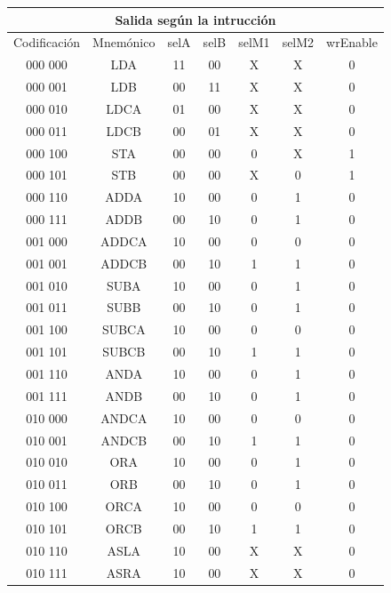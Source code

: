\documentclass[paper=letter, fontsize=12pt]{article}
\begin{document}
\begin{table}
\centering
\begin{tabular}{cc|ccccc}
\multicolumn{7}{c}{Salida según la intrucción} \\ \hline
Codificación& Mnemónico	  	& selA & selB & selM1 & selM2 & wrEnable \\ \hline
000 000 	& LDA 		  	& 11 	& 00    & X     & X     & 0 \\
000 001		& LDB  			& 00 	& 11    & X     & X     & 0 \\           
000 010 	& LDCA 			& 01 	& 00    & X     & X     & 0 \\            
000 011 	& LDCB 			& 00 	& 01    & X     & X     & 0 \\           
000 100 	& STA  	 		& 00 	& 00    & 0     & X     & 1 \\            
000 101 	& STB  			& 00 	& 00    & X     & 0     & 1 \\            
000 110 	& ADDA			& 10 	& 00    & 0     & 1     & 0 \\
000 111 	& ADDB			& 00 	& 10    & 0     & 1     & 0 \\
001 000 	& ADDCA			& 10 	& 00    & 0     & 0     & 0 \\
001 001 	& ADDCB			& 00 	& 10    & 1     & 1     & 0 \\
001 010 	& SUBA			& 10 	& 00    & 0     & 1     & 0 \\
001 011 	& SUBB			& 00 	& 10    & 0     & 1     & 0 \\
001 100 	& SUBCA			& 10 	& 00    & 0     & 0     & 0 \\
001 101 	& SUBCB			& 00 	& 10    & 1     & 1     & 0 \\
001 110 	& ANDA			& 10 	& 00    & 0     & 1     & 0 \\
001 111 	& ANDB			& 00 	& 10    & 0    	& 1     & 0 \\
010 000 	& ANDCA			& 10 	& 00    & 0     & 0     & 0 \\
010 001 	& ANDCB			& 00 	& 10    & 1     & 1     & 0 \\
010 010 	& ORA			& 10 	& 00    & 0     & 1     & 0 \\
010 011 	& ORB			& 00 	& 10    & 0     & 1     & 0 \\
010 100 	& ORCA			& 10 	& 00    & 0     & 0     & 0 \\
010 101 	& ORCB			& 00 	& 10    & 1     & 1     & 0 \\
010 110 	& ASLA			& 10 	& 00    & X     & X     & 0 \\
010 111 	& ASRA			& 10 	& 00    & X     & X     & 0 \\
	

\end{tabular}
\end{table}
\end{document}
